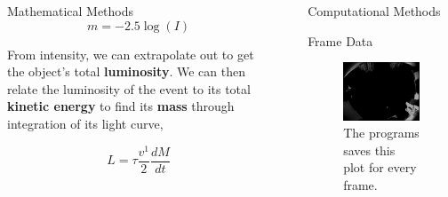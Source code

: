 \documentclass[final]{beamer}
\newlength{\sepwid}
\newlength{\onecolwid}
\begin{document}
\begin{frame}[t]
\begin{columns}[t]
\begin{column}{\onecolwid}
\begin{block}{Mathematical Methods}
\begin{equation}
m = -2.5 \log(I)
\label{eqn:Light}
\end{equation}

From intensity, we can extrapolate out to get the object's total \textbf{luminosity}. We can then relate the luminosity of the event to its total \textbf{kinetic energy} to find its \textbf{mass} through integration of its light curve,

\begin{equation}
L = \tau \frac{v^1}{2} \frac{dM}{dt}
\label{eq:Mass}
\end{equation}
\end{block}

\end{column} %

\begin{column}{\sepwid}\end{column} %

\begin{column}{\onecolwid} %

\begin{block}{Computational Methods}


\begin{alertblock}{Frame Data}

\begin{figure}
\includegraphics[width=\linewidth]{iridium3.png}
\caption{The programs saves this plot for every frame.}
\end{figure}


\end{alertblock}
\end{block}
\end{column}
\end{columns}
\end{frame}
\end{document}
